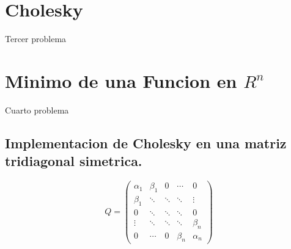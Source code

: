 \documentclass{article}
\begin{document}
    \section{Cholesky}
    Tercer problema

    \subsection{}

    \subsection{}

    \subsection{}

    \subsection{}

    \section{Minimo de una Funcion en $R^n$}
    Cuarto problema

    \subsection{}

    \subsection{}

    \subsection{Implementacion de Cholesky en una matriz tridiagonal simetrica.}
    \begin{equation*}
        Q = \begin{pmatrix} 
                \alpha_1 & \beta_1 &    0   & \cdots  &   0     \\ 
                \beta_1  & \ddots  & \ddots & \ddots  & \vdots  \\
                  0      & \ddots  & \ddots & \ddots  &   0     \\
                \vdots   & \ddots  & \ddots & \ddots  & \beta_n \\
                  0      & \cdots  &    0   & \beta_n & \alpha_n
            \end{pmatrix}
    \end{equation*}
\end{document}
